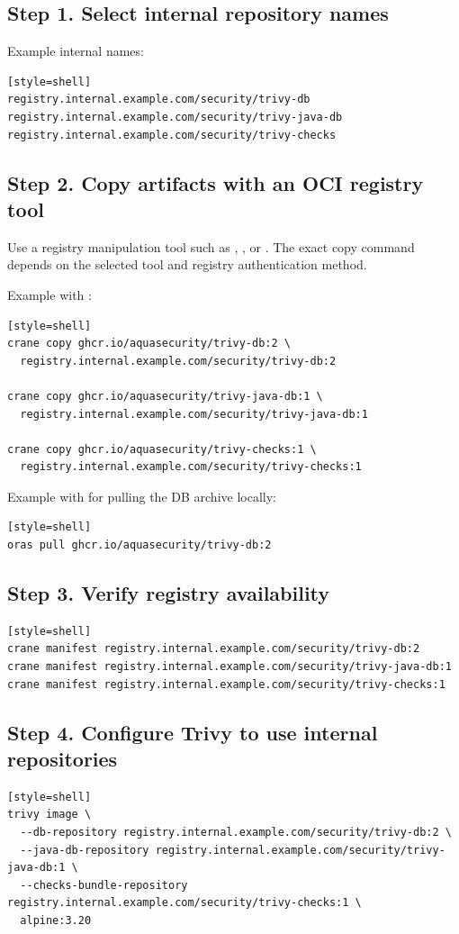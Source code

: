\documentclass[10pt]{article}
\newcommand{\artifact}[1]{\path{#1}}
\begin{document}
\subsection{Step 1. Select internal repository names}
Example internal names:
\begin{verbatim}[style=shell]
registry.internal.example.com/security/trivy-db
registry.internal.example.com/security/trivy-java-db
registry.internal.example.com/security/trivy-checks
\end{verbatim}

\subsection{Step 2. Copy artifacts with an OCI registry tool}
Use a registry manipulation tool such as \artifact{crane}, \artifact{oras}, or \artifact{regctl}. The exact copy command depends on the selected tool and registry authentication method.

Example with \artifact{crane}:
\begin{verbatim}[style=shell]
crane copy ghcr.io/aquasecurity/trivy-db:2 \
  registry.internal.example.com/security/trivy-db:2

crane copy ghcr.io/aquasecurity/trivy-java-db:1 \
  registry.internal.example.com/security/trivy-java-db:1

crane copy ghcr.io/aquasecurity/trivy-checks:1 \
  registry.internal.example.com/security/trivy-checks:1
\end{verbatim}

Example with \artifact{oras} for pulling the DB archive locally:
\begin{verbatim}[style=shell]
oras pull ghcr.io/aquasecurity/trivy-db:2
\end{verbatim}

\subsection{Step 3. Verify registry availability}
\begin{verbatim}[style=shell]
crane manifest registry.internal.example.com/security/trivy-db:2
crane manifest registry.internal.example.com/security/trivy-java-db:1
crane manifest registry.internal.example.com/security/trivy-checks:1
\end{verbatim}

\subsection{Step 4. Configure Trivy to use internal repositories}
\begin{verbatim}[style=shell]
trivy image \
  --db-repository registry.internal.example.com/security/trivy-db:2 \
  --java-db-repository registry.internal.example.com/security/trivy-java-db:1 \
  --checks-bundle-repository registry.internal.example.com/security/trivy-checks:1 \
  alpine:3.20
\end{verbatim}
\end{document}
